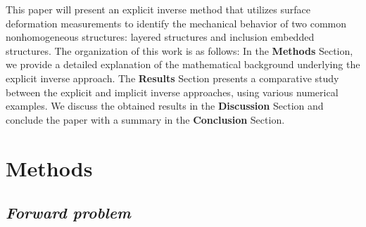 \documentclass[11pt]{article}
\begin{document}
This paper will present an explicit inverse method that utilizes
surface deformation measurements to identify the mechanical behavior
of two common nonhomogeneous structures: layered structures and
inclusion embedded structures. The organization of this work is as
follows: In the \textbf{Methods} Section, we provide a detailed
explanation of the mathematical background underlying the explicit
inverse approach. The \textbf{Results} Section presents a comparative
study between the explicit and implicit inverse approaches, using
various numerical examples. We discuss the obtained results in the
\textbf{Discussion} Section and conclude the paper with a summary in
the \textbf{Conclusion} Section.

\section*{Methods}

\subsection*{\textit{Forward problem}}
\end{document}

